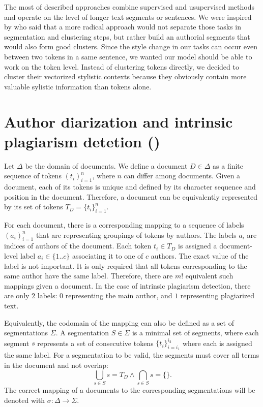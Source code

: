 \documentclass[10pt, a4paper]{article}
\begin{document}
The most of described approaches combine supervised and usupervised methods and operate on the level of longer text segments or sentences. We were inspired by \citet{brooke-2013} who said that a more radical approach would not separate those tasks in segmentation and clustering steps, but rather build an authorial segments that would also form good clusters. Since the style change in our tasks can occur even between two tokens in a same sentence, we wanted our model should be able to work on the token level. Instead of clustering tokens directly, we decided to cluster their vectorized stylistic contexts because they obviously contain more valuable sylistic information than tokens alone.

\section{Author diarization and intrinsic plagiarism detetion ()}

Let $\Delta$ be the domain of documents. We define a document $D\in \Delta$ as a finite sequence of tokens $(t_i)_{i=1}^n$, where $n$ can differ among documents. Given a document, each of its tokens is unique and defined by its character sequence and position in the document. Therefore, a document can be equivalently represented by its set of tokens $T_D=\{t_i\}_{i=1}^n$.

For each document, there is a corresponding mapping to a sequence of labels $(a_i)_{i=1}^n$ that are representing groupings of tokens by authors. The labels $a_i$ are indices of authors of the document. Each token $t_i\in T_D$ is assigned a document-level label $a_i \in \{1..c\}$ associating it to one of $c$ authors. The exact value of the label is not important. It is only required that all tokens corresponding to the same author have the same label. Therefore, there are $m!$ equivalent such mappings given a document. In the case of intrinsic plagiarism detection, there are only $2$ labels: $0$ representing the main author, and $1$ representing plagiarized text.

Equivalently, the codomain of the mapping can also be defined as a set of segmentations $\Sigma$. A segmentation $S\in \Sigma$ is a minimal set of segments, where each segment $s$ represents a set of consecutive tokens $\{t_i\}_{i=i_1}^{i_2}$ where each is assigned the same label. For a segmentation to be valid, the segments must cover all terms in the document and not overlap:
\begin{equation}
	\bigcup_{s\in S}s = T_D  \wedge \bigcap_{s\in S}s = \{\}.
\end{equation}
The correct mapping of a documents to the corresponding segmentations will be denoted with $\sigma: \Delta\rightarrow\Sigma$.
\end{document}
